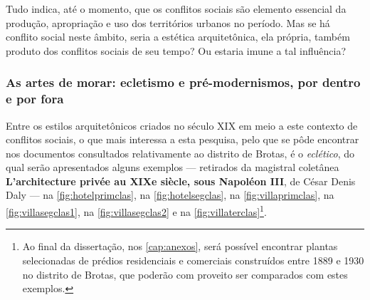 Tudo indica, até o momento, que os conflitos sociais são elemento essencial da produção, apropriação e uso dos territórios urbanos no período. Mas se há conflito social neste âmbito, seria a estética arquitetônica, ela própria, também produto dos conflitos sociais de seu tempo? Ou estaria imune a tal influência?

\subsubsection{As artes de morar: ecletismo e pré-modernismos, por dentro e por fora}\label{subsec:armor}

Entre os estilos arquitetônicos criados no século XIX em meio a este contexto de conflitos sociais, o que mais interessa a esta pesquisa, pelo que se pôde encontrar nos documentos consultados relativamente ao distrito de Brotas, é o \textit{eclético}, do qual serão apresentados alguns exemplos --- retirados da magistral coletânea \textbf{L’architecture privée au XIXe siècle, sous Napoléon III}, de César Denis Daly --- na \autoref{fig:hotelprimclas}, na \autoref{fig:hotelsegclas}, na \autoref{fig:villaprimclas}, na \autoref{fig:villasegclas1}, na \autoref{fig:villasegclas2} e na \autoref{fig:villaterclas}\footnote{Ao final da dissertação, nos \autoref{cap:anexos}, será possível encontrar plantas selecionadas de prédios residenciais e comerciais construídos entre 1889 e 1930 no distrito de Brotas, que poderão com proveito ser comparados com estes exemplos.}.




